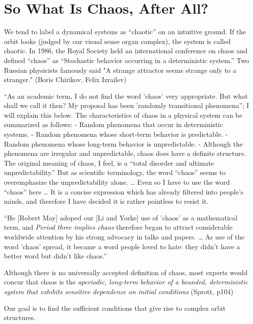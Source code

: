 \documentclass[12pt,twoside,draft]{book}
\begin{document}
\section{So What Is Chaos, After All?}
We tend to label a dynamical systems as ``chaotic'' on an intuitive ground.
If the orbit looks (judged by our visual sense organ complex), the system is called chaotic.
In 1986, the Royal Society held an international conference on chaos and defined ``chaos'' as ``Stochastic behavior occurring in a deterministic system.'' \cite{stewart}
Two Russian physicists famously said "A strange attractor seems strange only to a stranger."
(Boris Chirikov, Felix Izrailev)\cite{lorentzbook}

``As an academic term, I do not find the word 'chaos' very appropriate.
But what shall we call it then?
My proposal has been 'randomly transitional phenomena''; I will explain this below.
The characteristics of chaos in a physical system can be summarized as follows:
- Random phenomena that occur in deterministic systems.
- Random phenomena whose short-term behavior is predictable.
- Random phenomena whose long-term behavior is unpredictable.
- Although the phenomena are irregular and unpredictable, chaos does have a definite structure.
The original meaning of chaos, I feel, is a ``total disorder and ultimate unpredictability.''
But as scientific terminology, the word ``chaos'' seems to overemphasize the unpredictability alone.
\ldots
Even so I have to use the word ``chaos'' here \ldots
It is a concise expression which has already filtered into people's minds, and therefore I have decided it is rather pointless to resist it.
\citep[24]{ueda-abraham}

``He [Robert May] adoped our [Li and Yorke] use of 'chaos' as a mathematical term, and \textit{Period three implies chaos} therefore began to attract considerable worldwide attention by his strong advocacy in talks and papers.
\ldots
As use of the word 'chaos' spread, it became a word people loved to hate: they didn't have a better word but didn't like chaos.''
\citep[205]{ueda-abraham}

Although there is no universally accepted definition of chaos, most experts would concur that chaos is the {\it aperiodic, long-term behavior of a bounded, deterministic system that exhibits sensitive dependence on initial conditions} (Sprott, p104)

Our goal is to find the sufficient conditions that give rise to complex orbit structures.
\end{document}

